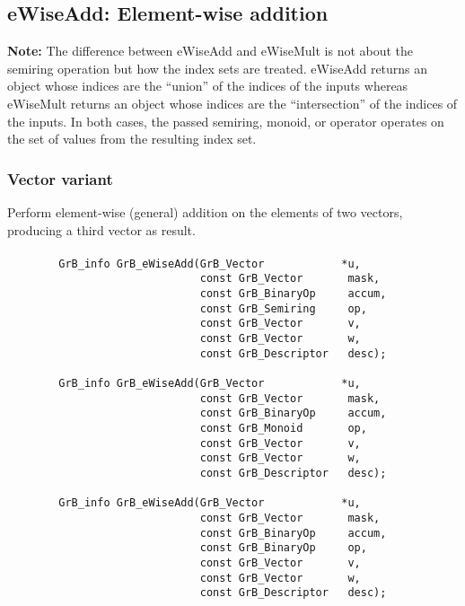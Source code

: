 


\subsection{{\sf eWiseAdd}: Element-wise addition}

{\bf Note:} The difference between {\sf eWiseAdd} and {\sf eWiseMult} is not about the semiring operation but how the index sets are treated.
 {\sf eWiseAdd} returns an object whose indices are the ``union'' of the indices of the inputs whereas  
 {\sf eWiseMult} returns an object whose indices are the ``intersection'' of the indices of the inputs. In both cases, the passed semiring, monoid, or operator operates on the 
 set of values from the resulting index set. 

\subsubsection{Vector variant}

Perform element-wise (general) addition on the elements of two vectors,
producing a third vector as result.

\paragraph{\syntax}

\begin{verbatim}
        GrB_info GrB_eWiseAdd(GrB_Vector            *u,
                              const GrB_Vector       mask,
                              const GrB_BinaryOp     accum,
                              const GrB_Semiring     op, 
                              const GrB_Vector       v,
                              const GrB_Vector       w,
                              const GrB_Descriptor   desc);
                            
        GrB_info GrB_eWiseAdd(GrB_Vector            *u,
                              const GrB_Vector       mask,
                              const GrB_BinaryOp     accum,
                              const GrB_Monoid       op, 
                              const GrB_Vector       v,
                              const GrB_Vector       w,
                              const GrB_Descriptor   desc);

        GrB_info GrB_eWiseAdd(GrB_Vector            *u,
                              const GrB_Vector       mask,
                              const GrB_BinaryOp     accum,
                              const GrB_BinaryOp     op, 
                              const GrB_Vector       v,
                              const GrB_Vector       w,
                              const GrB_Descriptor   desc);
\end{verbatim}

